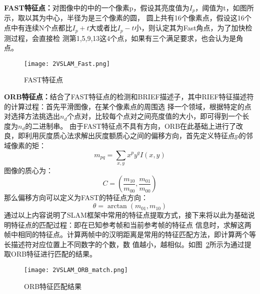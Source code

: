 \textbf{FAST特征点：}对图像中的中的一个像素p，假设其亮度值为$I_p$，阈值为t，如图所示，取以其为中心，半径为是三个像素的圆，
圆上共有16个像素点，假设这16个点中有连续N个点都比$I_p+t$大或者比$I_p-t$小，则认定其为Fast角点，为了加快检测过程，会直接检
测第1,5,9,13这4个点，如果有三个满足要求，也会认为是角点。
\begin{figure}[H] %
  \centering
  \texttt{[image: 2VSLAM\_Fast.png]}
  \caption{FAST特征点}
  \label{fig:2VSLAM_Fast}
\end{figure}
\textbf{ORB特征点：}结合了FAST特征点的检测和BRIEF描述子，其中RIEF特征描述符的计算过程：首先平滑图像，在某个像素点的周围选
择一个领域，根据特定的点对选择方法挑选出$n_d$个点对，比较每个点对之间亮度值的大小，即可得到一个长度为$n_d$的二进制串。
由于FAST特征点不具有方向，ORB在此基础上进行了改良，即利用灰度质心法求解出灰度额质心之间的偏移方向，首先定义特征点p的邻域像素的矩：
\begin{equation}
  m_{p q}=\sum_{x, y} x^{p} y^{q} I(x, y)
\end{equation}
图像的质心为：
\begin{equation}
  C=\left(\frac{m_{10}}{m_{00}}, \frac{m_{01}}{m_{00}}\right)
\end{equation}
那么偏移方向可以定义为FAST的特征点方向：
\begin{equation}
  \theta=\arctan \left(m_{01}, m_{10}\right)
\end{equation}
通过以上内容说明了SLAM框架中常用的特征点提取方式，接下来将以此为基础说明特征点的匹配过程：即在已知参考帧和当前参考帧的特征点
信息时，求解这两帧中相同的特征点。计算两帧中的汉明距离是常用的特征匹配方法，即计算两个等长描述符对应位置上不同数字的个数，数
值越小，越相似。如图~\ref{fig:2VSLAM_ORB_match}所示为通过提取ORB特征进行匹配的结果。
\begin{figure}[H] %
  \centering
  \texttt{[image: 2VSLAM\_ORB\_match.png]}
  \caption{ORB特征匹配结果}
  \label{fig:2VSLAM_ORB_match}
\end{figure}



